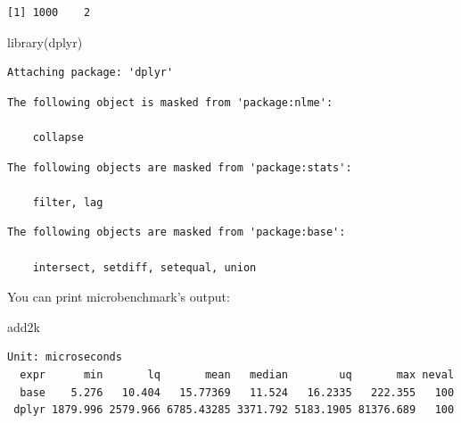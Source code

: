 \documentclass[
]{book}
\newenvironment{Shaded}{\begin{snugshade}}{\end{snugshade}}
\newcommand{\AttributeTok}[1]{\textcolor[rgb]{0.77,0.63,0.00}{#1}}
\newcommand{\FunctionTok}[1]{\textcolor[rgb]{0.00,0.00,0.00}{#1}}
\newcommand{\NormalTok}[1]{#1}
\newcommand{\OtherTok}[1]{\textcolor[rgb]{0.56,0.35,0.01}{#1}}
\newcommand{\SpecialCharTok}[1]{\textcolor[rgb]{0.00,0.00,0.00}{#1}}
\begin{document}
\begin{verbatim}
[1] 1000    2
\end{verbatim}

\begin{Shaded}
\begin{Highlighting}[]
\FunctionTok{library}\NormalTok{(dplyr)}
\end{Highlighting}
\end{Shaded}

\begin{verbatim}
Attaching package: 'dplyr'
\end{verbatim}

\begin{verbatim}
The following object is masked from 'package:nlme':

    collapse
\end{verbatim}

\begin{verbatim}
The following objects are masked from 'package:stats':

    filter, lag
\end{verbatim}

\begin{verbatim}
The following objects are masked from 'package:base':

    intersect, setdiff, setequal, union
\end{verbatim}

\begin{Shaded}
\end{Shaded}

You can print microbenchmark's output:

\begin{Shaded}
\begin{Highlighting}[]
\NormalTok{add2k}
\end{Highlighting}
\end{Shaded}

\begin{verbatim}
Unit: microseconds
  expr      min       lq       mean   median        uq       max neval
  base    5.276   10.404   15.77369   11.524   16.2335   222.355   100
 dplyr 1879.996 2579.966 6785.43285 3371.792 5183.1905 81376.689   100
\end{verbatim}
\end{document}
